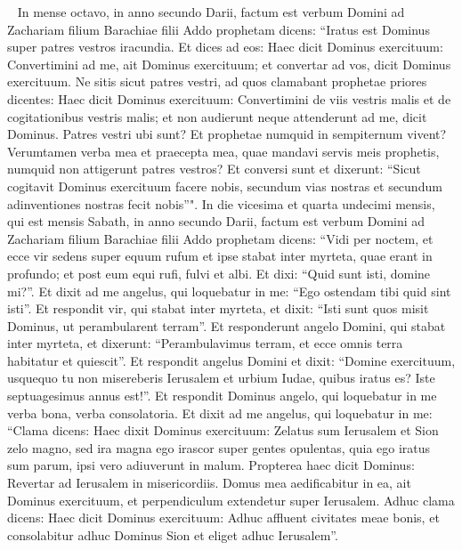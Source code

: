 
\begin{biblechapter}   
\verse In mense octavo, in anno secundo Darii, factum est verbum Domini ad Zachariam filium Barachiae filii Addo prophetam dicens: 
\verse “Iratus est Dominus super patres vestros iracundia. 
\verse Et dices ad eos: Haec dicit Dominus exercituum: Convertimini ad me, ait Dominus exercituum; et convertar ad vos, dicit Dominus exercituum. 
\verse Ne sitis sicut patres vestri, ad quos clamabant prophetae priores dicentes: Haec dicit Dominus exercituum: Convertimini de viis vestris malis et de cogitationibus vestris malis; et non audierunt neque attenderunt ad me, dicit Dominus. 
\verse Patres vestri ubi sunt? Et prophetae numquid in sempiternum vivent? 
\verse Verumtamen verba mea et praecepta mea, quae mandavi servis meis prophetis, numquid non attigerunt patres vestros? Et conversi sunt et dixerunt: “Sicut cogitavit Dominus exercituum facere nobis, secundum vias nostras et secundum adinventiones nostras fecit nobis”". 
\verse In die vicesima et quarta undecimi mensis, qui est mensis Sabath, in anno secundo Darii, factum est verbum Domini ad Zachariam filium Barachiae filii Addo prophetam dicens: 
\verse “Vidi per noctem, et ecce vir sedens super equum rufum et ipse stabat inter myrteta, quae erant in profundo; et post eum equi rufi, fulvi et albi. 
\verse Et dixi: “Quid sunt isti, domine mi?”. Et dixit ad me angelus, qui loquebatur in me: “Ego ostendam tibi quid sint isti”. 
\verse Et respondit vir, qui stabat inter myrteta, et dixit: “Isti sunt quos misit Dominus, ut perambularent terram”. 
\verse Et responderunt angelo Domini, qui stabat inter myrteta, et dixerunt: “Perambulavimus terram, et ecce omnis terra habitatur et quiescit”. 
\verse Et respondit angelus Domini et dixit: “Domine exercituum, usquequo tu non misereberis Ierusalem et urbium Iudae, quibus iratus es? Iste septuagesimus annus est!”. 
\verse Et respondit Dominus angelo, qui loquebatur in me verba bona, verba consolatoria. 
\verse Et dixit ad me angelus, qui loquebatur in me: “Clama dicens: Haec dixit Dominus exercituum: Zelatus sum Ierusalem et Sion zelo magno, 
\verse sed ira magna ego irascor super gentes opulentas, quia ego iratus sum parum, ipsi vero adiuverunt in malum. 
\verse Propterea haec dicit Dominus: Revertar ad Ierusalem in misericordiis. Domus mea aedificabitur in ea, ait Dominus exercituum, et perpendiculum extendetur super Ierusalem. 
\verse Adhuc clama dicens: Haec dicit Dominus exercituum: Adhuc affluent civitates meae bonis, et consolabitur adhuc Dominus Sion et eliget adhuc Ierusalem”. 
\end{biblechapter}

